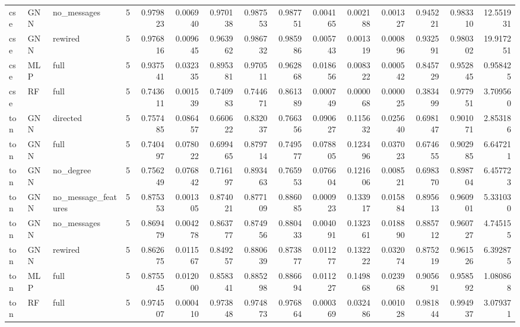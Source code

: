 \begin{tabular}{lllrrrrrrrrrrrr}
cse & GNN & no\_messages & 5 & 0.979823 & 0.006940 & 0.970138 & 0.987553 & 0.987751 & 0.004165 & 0.002188 & 0.001327 & 0.945221 & 0.983310 & 12.551931 \\
cse & GNN & rewired & 5 & 0.976816 & 0.009645 & 0.963962 & 0.986732 & 0.985986 & 0.005743 & 0.001319 & 0.000896 & 0.932591 & 0.980302 & 19.917251 \\
cse & MLP & full & 5 & 0.937541 & 0.032335 & 0.895381 & 0.970511 & 0.962868 & 0.018656 & 0.008322 & 0.000542 & 0.845729 & 0.952845 & 0.958425 \\
cse & RF & full & 5 & 0.743611 & 0.001539 & 0.740983 & 0.744671 & 0.861389 & 0.000749 & 0.000068 & 0.000025 & 0.383499 & 0.977951 & 3.709560 \\
ton & GNN & directed & 5 & 0.757485 & 0.086457 & 0.660622 & 0.832037 & 0.766356 & 0.090627 & 0.115632 & 0.025640 & 0.698147 & 0.901071 & 2.853186 \\
ton & GNN & full & 5 & 0.740497 & 0.078022 & 0.699465 & 0.879714 & 0.749577 & 0.078805 & 0.123496 & 0.037023 & 0.674655 & 0.902985 & 6.647211 \\
ton & GNN & no\_degree & 5 & 0.756249 & 0.076842 & 0.716197 & 0.893463 & 0.765953 & 0.076604 & 0.121606 & 0.008521 & 0.698370 & 0.898704 & 6.457723 \\
ton & GNN & no\_message\_features & 5 & 0.875353 & 0.001305 & 0.874021 & 0.877109 & 0.886085 & 0.000923 & 0.133917 & 0.015884 & 0.895613 & 0.960901 & 5.331030 \\
ton & GNN & no\_messages & 5 & 0.869479 & 0.004278 & 0.863777 & 0.874956 & 0.880433 & 0.004091 & 0.132361 & 0.018890 & 0.885712 & 0.960727 & 4.745155 \\
ton & GNN & rewired & 5 & 0.862675 & 0.011567 & 0.849257 & 0.880639 & 0.873877 & 0.011277 & 0.132222 & 0.032074 & 0.875219 & 0.961526 & 6.392875 \\
ton & MLP & full & 5 & 0.875545 & 0.012000 & 0.858341 & 0.885298 & 0.886694 & 0.011227 & 0.149868 & 0.023968 & 0.905691 & 0.958592 & 1.080868 \\
ton & RF & full & 5 & 0.974507 & 0.000410 & 0.973848 & 0.974873 & 0.976864 & 0.000369 & 0.032486 & 0.001028 & 0.981844 & 0.994937 & 3.079371 \\
\bottomrule
\end{tabular}
